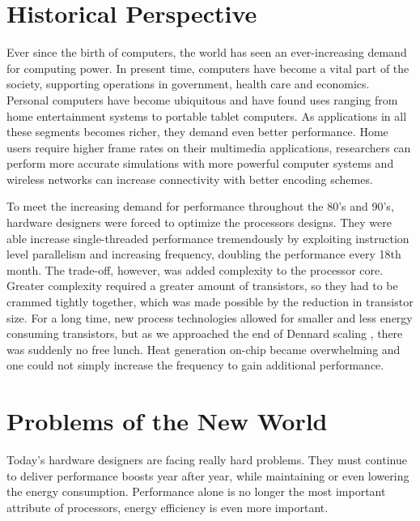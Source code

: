 
\section{Historical Perspective}

Ever since the birth of computers, the world has seen an ever-increasing demand
for computing power. In present time, computers have become a vital part of the
society, supporting operations in government, health care and economics.
Personal computers have become ubiquitous and have found uses ranging from home
entertainment systems to portable tablet computers. As applications in all these
segments becomes richer, they demand even better performance. Home users require
higher frame rates on their multimedia applications, researchers can perform
more accurate simulations with more powerful computer systems and wireless
networks can increase connectivity with better encoding schemes.

To meet the increasing demand for performance throughout the 80's and 90's,
hardware designers were forced to optimize the processors designs. They were
able increase single-threaded performance tremendously by exploiting instruction
level parallelism and increasing frequency, doubling the performance every 18th
month. The trade-off, however, was added complexity to the processor core.
Greater complexity required a greater amount of transistors, so they had to be
crammed tightly together, which was made possible by the reduction in transistor
size. For a long time, new process technologies allowed for smaller and less
energy consuming transistors, but as we approached the end of Dennard scaling
\cite{dennard}, there was suddenly no free lunch. Heat generation on-chip
became overwhelming and one could not simply increase the frequency to gain
additional performance.

\section{Problems of the New World}

Today's hardware designers are facing really hard problems. They must
continue to deliver performance boosts year after year, while maintaining
or even lowering the energy consumption. Performance alone is no longer the most
important attribute of processors, energy efficiency is even more important.


